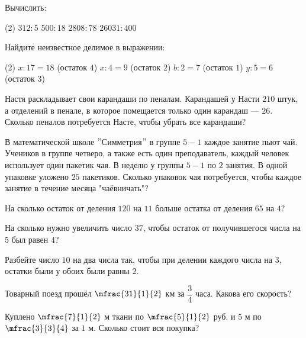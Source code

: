 	\begin{listofex}
			\item Вычислить:
				\begin{tasks}(2)
					\task \( 312:5 \)
					\task \( 500:18 \)
					\task \( 2808:78 \)
					\task \( 26031:400 \)
				\end{tasks}	
			\item Найдите неизвестное делимое в выражении:
			\begin{tasks}(2)
				\task \( x:17=18 \) (остаток \( 4 \))
				\task \( x:4=9 \) (остаток \( 2 \))
				\task \( b:2=7 \) (остаток \( 1 \))
				\task \( y:5=6 \) (остаток \( 3 \))
			\end{tasks}	
			\item Настя раскладывает свои карандаши по пеналам. Карандашей у Насти \( 210 \) штук, а отделений в пенале, в которое помещается только один карандаш --- \( 26 \). Сколько пеналов потребуется Насте, чтобы убрать все карандаши?
			\item В математической школе \( " \)Симметрия\( " \) в группе \( 5-1 \) каждое занятие пьют чай. Учеников в группе четверо, а также есть один преподаватель, каждый человек использует один пакетик чая. В неделю у группы \( 5-1 \) по \( 2 \) занятия. В одной упаковке уложено \( 25 \) пакетиков. Сколько упаковок чая потребуется, чтобы каждое занятие в течение месяца "чаёвничать"?
			\item На сколько остаток от деления \( 120 \) на \( 11 \) больше остатка от деления \( 65 \) на \( 4 \)?
			\item На сколько нужно увеличить число \( 37 \), чтобы остаток от получившегося числа на \( 5 \) был равен \( 4 \)?
			\item Разбейте число \( 10 \) на два числа так, чтобы при делении каждого числа на \( 3 \), остатки были у обоих были равны \( 2 \).
			\item Товарный поезд прошёл \( \mfrac{31}{1}{2} \) км за \( \dfrac{3}{4} \) часа. Какова его скорость?
			\item Куплено \( \mfrac{7}{1}{2} \) м ткани по \( \mfrac{5}{1}{2} \) руб. и \( 5 \) м по \( \mfrac{3}{3}{4} \) за \( 1 \) м. Сколько стоит вся покупка?
	\end{listofex}